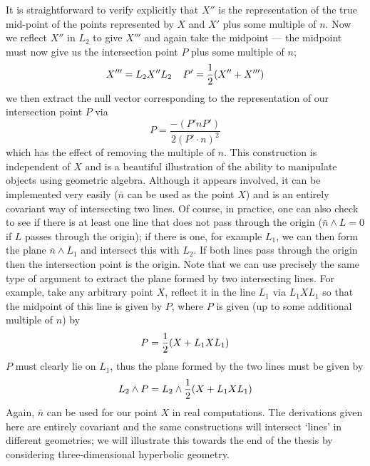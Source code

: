 %
It is straightforward to verify explicitly that $X''$ is the
representation of the true mid-point of the points represented
by $X$ and $X'$ plus some multiple of $n$.
Now we reflect $X''$ in $L_2$ to give $X'''$ and again
take the midpoint --- the midpoint must now give us the
intersection point $P$ plus some multiple of $n$;
%
\[ X''' = L_2X''L_2 \;\;\;\;  P' = \frac{1}{2} (X''+X''')   \]
%
we then extract the null vector corresponding to the representation of our
intersection point $P$ via
%
\[ P = \frac{-(P'nP')}{2(P'\cdot n)^2}   \]
%
which has the effect of removing the multiple of $n$.
This construction is independent of $X$ and is a
beautiful illustration of the ability to manipulate
objects using geometric algebra. Although it appears
involved, it can be implemented very easily ($\bar{n}$
can be used as the point $X$) and is an entirely
covariant way of intersecting two lines. Of course, in
practice, one can also check to see if there is at least
one line that does not pass through the origin
($\bar{n}\wedge L=0$ if $L$ passes through the origin); if
there is one, for example $L_1$, we can then form the plane
$\bar{n}\wedge L_1$ and intersect this with $L_2$. If both
lines pass through the origin then the intersection point
is the origin. Note that we can use precisely the same
type of argument to extract the plane formed by two
intersecting lines. For example, take any arbitrary point
$X$, reflect it in the line $L_1$ via $L_1 X L_1$ so
that the midpoint of this line is given by $P$, where $P$
is given (up to some additional multiple of $n$) by
%
\[  P = \frac{1}{2} (X + L_1 X L_1)   \]
%
$P$ must clearly lie on $L_1$, thus the plane formed by
the two lines must be given by
%
\begin{equation}
 L_2\wedge P = L_2 \wedge \frac{1}{2}(X + L_1X L_1)
\end{equation}
%
Again, $\bar{n}$ can be used for our point $X$ in real
computations. The derivations given here are entirely
covariant and the same constructions will intersect `lines' in different
geometries; we will illustrate this towards the end of the thesis by
considering three-dimensional hyperbolic geometry.

